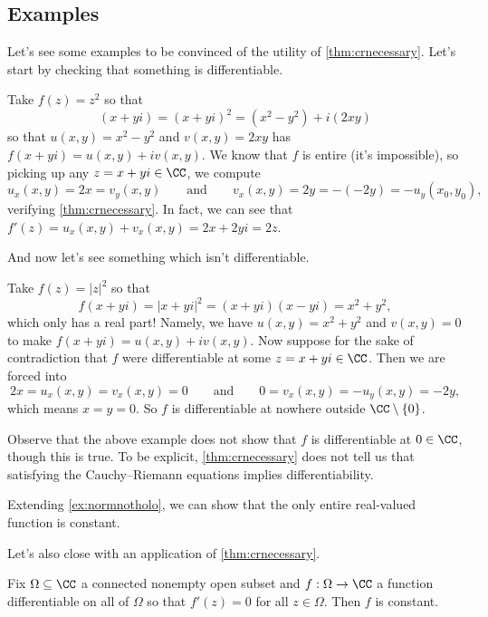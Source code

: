 \subsection{Examples}
Let's see some examples to be convinced of the utility of \autoref{thm:crnecessary}. Let's start by checking that something is differentiable.
\begin{example}
	Take $f(z)=z^2$ so that 
	\[(x+yi)=(x+yi)^2=\left(x^2-y^2\right)+i(2xy)\]
	so that $u(x,y)=x^2-y^2$ and $v(x,y)=2xy$ has $f(x+yi)=u(x,y)+iv(x,y)$. We know that $f$ is entire (it's impossible), so picking up any $z=x+yi\in\CC$, we compute
	\[u_x(x,y)=2x=v_y(x,y)\qquad\text{and}\qquad v_x(x,y)=2y=-(-2y)=-u_y(x_0,y_0),\]
	verifying \autoref{thm:crnecessary}. In fact, we can see that $f'(z)=u_x(x,y)+v_x(x,y)=2x+2yi=2z$.
\end{example}
And now let's see something which isn't differentiable.
\begin{example} \label{ex:normnotholo}
	Take $f(z)=|z|^2$ so that
	\[f(x+yi)=|x+yi|^2=(x+yi)(x-yi)=x^2+y^2,\]
	which only has a real part! Namely, we have $u(x,y)=x^2+y^2$ and $v(x,y)=0$ to make $f(x+yi)=u(x,y)+iv(x,y)$. Now suppose for the sake of contradiction that $f$ were differentiable at some $z=x+yi\in\CC$. Then we are forced into
	\[2x=u_x(x,y)=v_x(x,y)=0\qquad\text{and}\qquad0=v_x(x,y)=-u_y(x,y)=-2y,\]
	which means $x=y=0$. So $f$ is differentiable at nowhere outside $\CC\setminus\{0\}$.
\end{example}
Observe that the above example does not show that $f$ is differentiable at $0\in\CC$, though this is true. To be explicit, \autoref{thm:crnecessary} does not tell us that satisfying the Cauchy--Riemann equations implies differentiability.
\begin{remark}
	Extending \autoref{ex:normnotholo}, we can show that the only entire real-valued function is constant.
\end{remark}
Let's also close with an application of \autoref{thm:crnecessary}.
\begin{corollary}
	Fix $\Omega\subseteq\CC$ a connected nonempty open subset and $f:\Omega\to\CC$ a function differentiable on all of $\Omega$ so that $f'(z)=0$ for all $z\in\Omega$. Then $f$ is constant.
\end{corollary}
